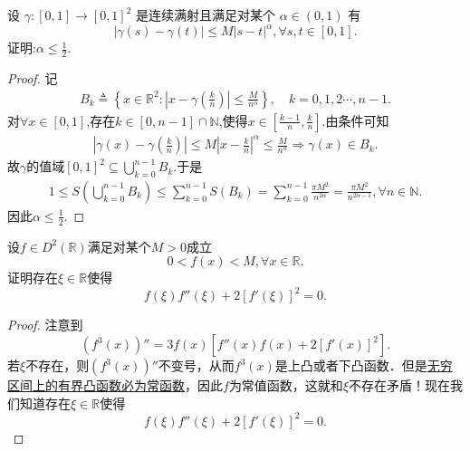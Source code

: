 \documentclass[../../main.tex]{subfiles}
\begin{document}
\begin{example}
设 $\gamma:[0,1]\to[0,1]^2$ 是连续满射且满足对某个 $\alpha\in(0,1)$ 有
\[
|\gamma(s)-\gamma(t)|\leqslant M|s-t|^\alpha,\forall s,t\in[0,1].
\]
证明:$\alpha\leqslant\frac{1}{2}$.
\end{example}
\begin{proof}
记
\begin{align*}
B_k\triangleq \left\{ x\in \mathbb{R} ^2:\left| x-\gamma \left( \frac{k}{n} \right) \right|\leqslant \frac{M}{n^{\alpha}} \right\},\quad k=0,1,2\cdots,n-1.
\end{align*}
对$\forall x\in \left[ 0,1 \right]$,存在$k\in \left[ 0,n-1 \right] \cap \mathbb{N}$,使得$x\in \left[ \frac{k-1}{n},\frac{k}{n} \right]$.由条件可知
\begin{align*}
\left| \gamma \left( x \right) -\gamma \left( \frac{k}{n} \right) \right|\leqslant M\left| x-\frac{k}{n} \right|^{\alpha}\leqslant \frac{M}{n^{\alpha}}\Longrightarrow \gamma \left( x \right) \in B_k.
\end{align*}
故$\gamma$的值域$\left[ 0,1 \right] ^2\subseteq \bigcup_{k=0}^{n-1}{B_k}$.于是
\begin{align*}
1\leqslant S\left( \bigcup_{k=0}^{n-1}{B_k} \right) \leqslant \sum\limits_{k=0}^{n-1}{S\left( B_k \right)}=\sum\limits_{k=0}^{n-1}{\frac{\pi M^2}{n^{2\alpha}}}=\frac{\pi M^2}{n^{2\alpha -1}},\forall n\in \mathbb{N}.
\end{align*}
因此$\alpha \leqslant \frac{1}{2}$.

\end{proof}

\begin{example}
设$f \in D^2(\mathbb{R})$满足对某个$M > 0$成立
$$0 < f(x) < M, \forall x \in \mathbb{R}.$$
证明存在$\xi \in \mathbb{R}$使得
$$f(\xi)f''(\xi) + 2[f'(\xi)]^2 = 0.$$
\end{example}
\begin{proof}
注意到
$$(f^3(x))'' = 3f(x)\left[f''(x)f(x) + 2[f'(x)]^2\right].$$
若$\xi$不存在，则$(f^3(x))''$不变号，从而$f^3(x)$是上凸或者下凸函数．但是\hyperref[proposition:无穷区间上的有界凸函数必为常函数]{无穷区间上的有界凸函数必为常函数}，因此$f$为常值函数，这就和$\xi$不存在矛盾！现在我们知道存在$\xi \in \mathbb{R}$使得
$$f(\xi)f''(\xi) + 2[f'(\xi)]^2 = 0.$$

\end{proof}
\end{document}

